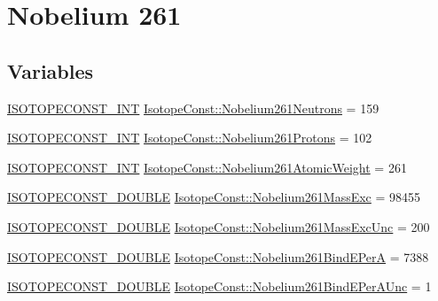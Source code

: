 \hypertarget{group___isotope_const-_nobelium-_no261}{}\section{Nobelium 261}
\label{group___isotope_const-_nobelium-_no261}
\subsection*{Variables}
\begin{DoxyCompactItemize}
\item 
\mbox{\hyperlink{group___isotope_const-_macros_ga5f18360b3e99483a35c32d789e62621c}{I\+S\+O\+T\+O\+P\+E\+C\+O\+N\+S\+T\+\_\+\+I\+NT}} \mbox{\hyperlink{group___isotope_const-_nobelium-_no261_ga81963f60745cb2d95fb7c39a3446cdee}{Isotope\+Const\+::\+Nobelium261\+Neutrons}} = 159
\item 
\mbox{\hyperlink{group___isotope_const-_macros_ga5f18360b3e99483a35c32d789e62621c}{I\+S\+O\+T\+O\+P\+E\+C\+O\+N\+S\+T\+\_\+\+I\+NT}} \mbox{\hyperlink{group___isotope_const-_nobelium-_no261_ga081d793b7e096626e6d0064798bb03b8}{Isotope\+Const\+::\+Nobelium261\+Protons}} = 102
\item 
\mbox{\hyperlink{group___isotope_const-_macros_ga5f18360b3e99483a35c32d789e62621c}{I\+S\+O\+T\+O\+P\+E\+C\+O\+N\+S\+T\+\_\+\+I\+NT}} \mbox{\hyperlink{group___isotope_const-_nobelium-_no261_gaa670dc5466e54a914466bf486a0565a2}{Isotope\+Const\+::\+Nobelium261\+Atomic\+Weight}} = 261
\item 
\mbox{\hyperlink{group___isotope_const-_macros_ga8f45a7272ce02c0b4c65c44636ed719a}{I\+S\+O\+T\+O\+P\+E\+C\+O\+N\+S\+T\+\_\+\+D\+O\+U\+B\+LE}} \mbox{\hyperlink{group___isotope_const-_nobelium-_no261_gaed40d2a16e3b81f757f1f58cdd679e8d}{Isotope\+Const\+::\+Nobelium261\+Mass\+Exc}} = 98455
\item 
\mbox{\hyperlink{group___isotope_const-_macros_ga8f45a7272ce02c0b4c65c44636ed719a}{I\+S\+O\+T\+O\+P\+E\+C\+O\+N\+S\+T\+\_\+\+D\+O\+U\+B\+LE}} \mbox{\hyperlink{group___isotope_const-_nobelium-_no261_ga82c75b4da1130b002c5e202aa65e85e0}{Isotope\+Const\+::\+Nobelium261\+Mass\+Exc\+Unc}} = 200
\item 
\mbox{\hyperlink{group___isotope_const-_macros_ga8f45a7272ce02c0b4c65c44636ed719a}{I\+S\+O\+T\+O\+P\+E\+C\+O\+N\+S\+T\+\_\+\+D\+O\+U\+B\+LE}} \mbox{\hyperlink{group___isotope_const-_nobelium-_no261_ga737dec4c5c9ff41d0d828285603d837a}{Isotope\+Const\+::\+Nobelium261\+Bind\+E\+PerA}} = 7388
\item 
\mbox{\hyperlink{group___isotope_const-_macros_ga8f45a7272ce02c0b4c65c44636ed719a}{I\+S\+O\+T\+O\+P\+E\+C\+O\+N\+S\+T\+\_\+\+D\+O\+U\+B\+LE}} \mbox{\hyperlink{group___isotope_const-_nobelium-_no261_gabef066e6e11b1f71ec46f1d0ff65e29a}{Isotope\+Const\+::\+Nobelium261\+Bind\+E\+Per\+A\+Unc}} = 1

\end{DoxyCompactItemize}
